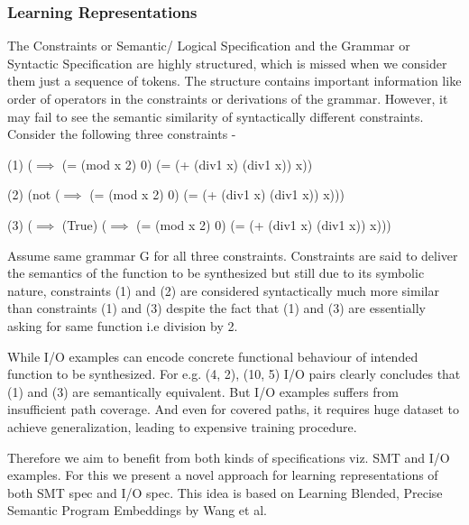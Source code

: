 
\subsubsection{Learning Representations}
The Constraints or Semantic/ Logical Specification and the Grammar or Syntactic Specification are highly structured, which is missed when we consider them just a sequence of tokens. The structure contains important information like order of operators in the constraints or derivations of the grammar. However, it may fail to see the semantic similarity of syntactically different constraints. Consider the following three constraints - 

(1) ($\implies$ (= (mod x 2) 0) (= (+ (div1 x) (div1 x)) x))
    
(2) (not ($\implies$ (= (mod x 2) 0) (= (+ (div1 x) (div1 x)) x)))

(3) ($\implies$ (True) ($\implies$ (= (mod x 2) 0) (= (+ (div1 x) (div1 x)) x)))

Assume same grammar G for all three constraints. Constraints are said to deliver the semantics of the function to be synthesized but still due to its symbolic nature, constraints (1) and (2) are considered syntactically much more similar than constraints (1) and (3) despite the fact that (1) and (3) are essentially asking for same function i.e division by 2.

While I/O examples can encode concrete functional behaviour of intended function to be synthesized. For e.g. {(4, 2), (10, 5)} I/O pairs clearly concludes that (1) and (3) are semantically equivalent. But I/O examples suffers from insufficient path coverage. And even for covered paths, it requires huge dataset to achieve generalization, leading to expensive training procedure.

Therefore we aim to benefit from both kinds of specifications viz. SMT and I/O examples. For this we present a novel approach for learning representations of both SMT spec and I/O spec. This idea is based on Learning Blended, Precise Semantic Program Embeddings by Wang et al. \cite{wang2019learning}

